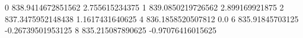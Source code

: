 0 838.9414672851562 2.755615234375
1 839.0850219726562 2.899169921875
2 837.3475952148438 1.1617431640625
4 836.1858520507812 0.0
6 835.91845703125 -0.26739501953125
8 835.215087890625 -0.97076416015625
